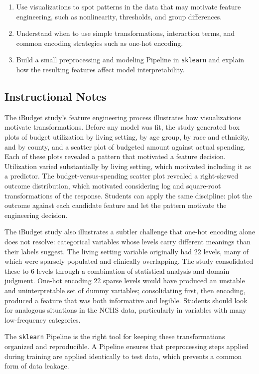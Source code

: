 \begin{enumerate}
    \item Use visualizations to spot patterns in the data that may
    motivate feature engineering, such as nonlinearity, thresholds,
    and group differences.
    \item Understand when to use simple transformations, interaction
    terms, and common encoding strategies such as one-hot encoding.
    \item Build a small preprocessing and modeling Pipeline in
    \verb|sklearn| and explain how the resulting features affect
    model interpretability.
\end{enumerate}

\subsection{Instructional Notes}

The iBudget study's feature engineering process illustrates how
visualizations motivate transformations. Before any model was fit,
the study generated box plots of budget utilization by living
setting, by age group, by race and ethnicity, and by county, and a
scatter plot of budgeted amount against actual spending. Each of
these plots revealed a pattern that motivated a feature decision.
Utilization varied substantially by living setting, which motivated
including it as a predictor. The budget-versus-spending scatter
plot revealed a right-skewed outcome distribution, which motivated
considering log and square-root transformations of the response.
Students can apply the same discipline: plot the outcome against
each candidate feature and let the pattern motivate the engineering
decision.

The iBudget study also illustrates a subtler challenge that
one-hot encoding alone does not resolve: categorical variables whose
levels carry different meanings than their labels suggest. The living
setting variable originally had 22 levels, many of which were
sparsely populated and clinically overlapping. The study consolidated
these to 6 levels through a combination of statistical analysis and
domain judgment. One-hot encoding 22 sparse levels would have
produced an unstable and uninterpretable set of dummy variables;
consolidating first, then encoding, produced a feature that was
both informative and legible. Students should look for analogous
situations in the NCHS data, particularly in variables with many
low-frequency categories.

The \verb|sklearn| Pipeline is the right tool for keeping these
transformations organized and reproducible. A Pipeline ensures that
preprocessing steps applied during training are applied identically
to test data, which prevents a common form of data leakage.

